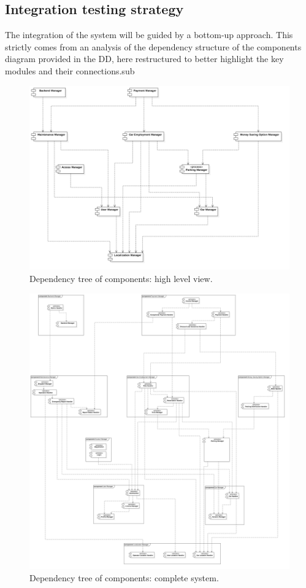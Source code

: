 \subsection{Integration testing strategy}
\label{sec:integration_testing_strategy}
	The integration of the system will be guided by a bottom-up approach. This strictly comes from an analysis of the dependency structure of the components diagram provided in the DD, here restructured to better highlight the key modules and their connections.sub
	\begin{figure}[h]
		\includegraphics[width=\textwidth, center]{img/integration_strategy/high_level_unravelled.png}
		\caption{Dependency tree of components: high level view.}
	\end{figure}
	\begin{figure}[h]
		\includegraphics[width=\textwidth, center]{img/integration_strategy/complete_unravelled.png}
		\caption{Dependency tree of components: complete system.}
	\end{figure}
	\FloatBarrier

